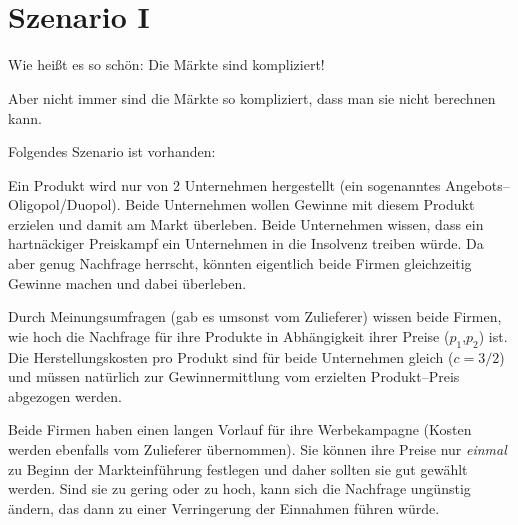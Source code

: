 \documentclass[paper=a4,notitlepage,parskip=half,plainheadsepline]{scrartcl}
\newif\ifloesung
\begin{document}
        \begin{tcolorbox}[toptitle=3mm,bottomtitle=3mm,title=\centering{{\lf J}\hfil FI Anwendungsentwicklung / Duales Studium\hfil {\lf J}},
          drop lifted shadow=gray]
        \centering{\vspace{0.5cm}\LARGE Programmierübung %
        \ifloesung (mit Musterlösung)\fi}\\[0.3cm]
        \\\vspace{0.5cm}
        \end{tcolorbox}

\section{Szenario I}
Wie heißt es so schön: Die Märkte sind kompliziert!

Aber nicht immer sind die Märkte so kompliziert, dass man sie nicht berechnen kann.

Folgendes Szenario ist vorhanden:

Ein Produkt wird nur von 2 Unternehmen hergestellt (ein sogenanntes Angebots--Oligopol/Duopol). Beide Unternehmen wollen Gewinne mit diesem Produkt erzielen und damit am Markt überleben. Beide Unternehmen wissen, dass ein hartnäckiger Preiskampf ein Unternehmen in die Insolvenz treiben würde. Da aber genug Nachfrage herrscht, könnten eigentlich beide Firmen gleichzeitig Gewinne machen und dabei überleben.

Durch Meinungsumfragen (gab es umsonst vom {Zu\-lieferer}) wissen beide Firmen, wie hoch die Nachfrage für ihre Produkte in Abhängigkeit ihrer Preise ($p_1$,$p_2$) ist.
Die Herstellungskosten pro Produkt sind für beide Unternehmen gleich ($c=3/2$) und müssen natürlich zur Gewinnermittlung vom erzielten Produkt--Preis abgezogen werden. 

Beide Firmen haben einen langen Vorlauf für ihre Werbekampagne (Kosten werden ebenfalls vom {Zu\-lieferer} übernommen). Sie können ihre Preise nur \emph{einmal} zu Beginn der Markteinführung festlegen und daher sollten sie gut gewählt werden.
Sind sie zu gering oder zu hoch, kann sich die Nachfrage ungünstig ändern, das dann zu einer Verringerung der Einnahmen führen würde.
\end{document}
